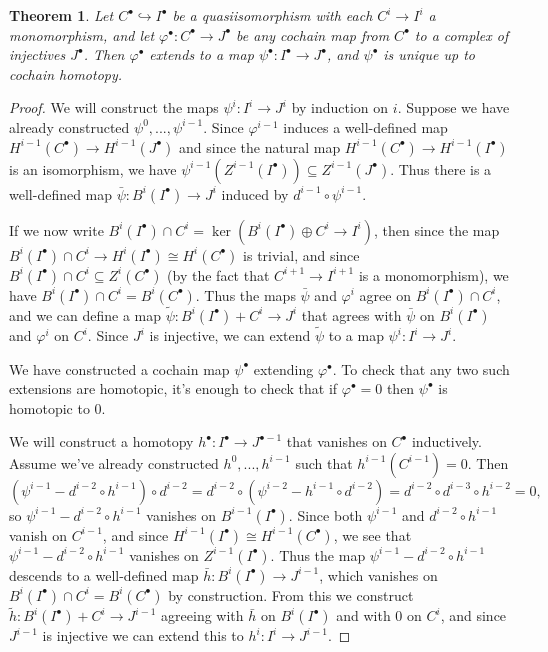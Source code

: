 \documentclass[letterpaper,11pt]{article}
\newtheorem{thm}{Theorem}
\theoremstyle{definition}
\theoremstyle{remark}
\begin{document}
\begin{thm}\label{resolution} Let $C^\bullet \hookrightarrow I^\bullet$ be a quasiisomorphism with each $C^i \rightarrow I^i$ a monomorphism, and let $\varphi^\bullet: C^\bullet \rightarrow J^\bullet$ be any cochain map from $C^\bullet$ to a complex of injectives $J^\bullet$. Then $\varphi^\bullet$ extends to a map $\psi^\bullet: I^\bullet \rightarrow J^\bullet$, and $\psi^\bullet$ is unique up to cochain homotopy.
\end{thm}
\begin{proof} We will construct the maps $\psi^i : I^i \rightarrow J^i$ by induction on $i$. Suppose we have already constructed $\psi^0, ..., \psi^{i-1}$. Since $\varphi^{i-1}$ induces a well-defined map $H^{i-1}(C^\bullet) \rightarrow H^{i-1}(J^\bullet)$ and since the natural map $H^{i-1}(C^\bullet) \rightarrow H^{i-1}(I^\bullet)$ is an isomorphism, we have $\psi^{i-1}(Z^{i-1}(I^\bullet)) \subseteq Z^{i-1}(J^\bullet)$. Thus there is a well-defined map $\bar\psi : B^i(I^\bullet) \rightarrow J^i$ induced by $d^{i-1}\circ\psi^{i-1}$.

If we now write $B^i(I^\bullet)\cap C^i = \ker(B^i(I^\bullet)\oplus C^i \rightarrow I^i)$, then since the map $B^i(I^\bullet)\cap C^i \rightarrow H^i(I^\bullet) \cong H^i(C^\bullet)$ is trivial, and since $B^i(I^\bullet)\cap C^i \subseteq Z^i(C^\bullet)$ (by the fact that $C^{i+1}\rightarrow I^{i+1}$ is a monomorphism), we have $B^i(I^\bullet)\cap C^i = B^i(C^\bullet)$. Thus the maps $\bar\psi$ and $\varphi^i$ agree on $B^i(I^\bullet)\cap C^i$, and we can define a map $\widetilde\psi : B^i(I^\bullet)+C^i \rightarrow J^i$ that agrees with $\bar\psi$ on $B^i(I^\bullet)$ and $\varphi^i$ on $C^i$. Since $J^i$ is injective, we can extend $\widetilde\psi$ to a map $\psi^i:I^i\rightarrow J^i$.

We have constructed a cochain map $\psi^\bullet$ extending $\varphi^\bullet$. To check that any two such extensions are homotopic, it's enough to check that if $\varphi^\bullet = 0$ then $\psi^\bullet$ is homotopic to $0$.

We will construct a homotopy $h^\bullet : I^\bullet \rightarrow J^{\bullet-1}$ that vanishes on $C^\bullet$ inductively. Assume we've already constructed $h^0, ..., h^{i-1}$ such that $h^{i-1}(C^{i-1}) = 0$. Then
\[
(\psi^{i-1} - d^{i-2}\circ h^{i-1})\circ d^{i-2} = d^{i-2}\circ(\psi^{i-2} - h^{i-1}\circ d^{i-2}) = d^{i-2}\circ d^{i-3}\circ h^{i-2} = 0,
\]
so $\psi^{i-1} - d^{i-2}\circ h^{i-1}$ vanishes on $B^{i-1}(I^\bullet)$. Since both $\psi^{i-1}$ and $d^{i-2}\circ h^{i-1}$ vanish on $C^{i-1}$, and since $H^{i-1}(I^\bullet)\cong H^{i-1}(C^\bullet)$, we see that $\psi^{i-1} - d^{i-2}\circ h^{i-1}$ vanishes on $Z^{i-1}(I^\bullet)$. Thus the map $\psi^{i-1} - d^{i-2}\circ h^{i-1}$ descends to a well-defined map $\bar{h}:B^i(I^\bullet)\rightarrow J^{i-1}$, which vanishes on $B^i(I^\bullet)\cap C^i = B^i(C^\bullet)$ by construction. From this we construct $\widetilde{h} : B^i(I^\bullet) + C^i \rightarrow J^{i-1}$ agreeing with $\bar{h}$ on $B^i(I^\bullet)$ and with $0$ on $C^i$, and since $J^{i-1}$ is injective we can extend this to $h^i : I^i \rightarrow J^{i-1}$.
\end{proof}
\end{document}
